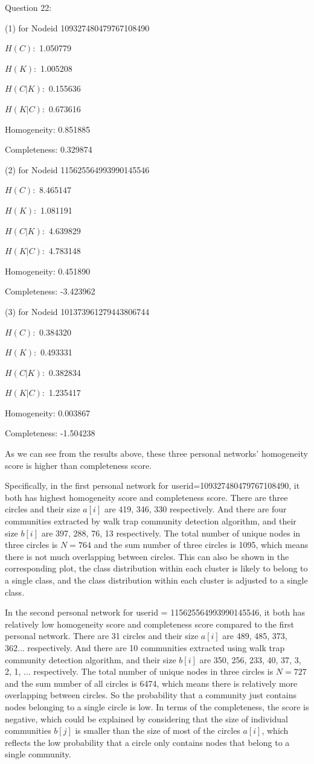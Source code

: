 \documentclass[11pt]{article}
\begin{document}
Question 22:

(1) for Nodeid 109327480479767108490 

$H(C):$ 1.050779

$H(K):$ 1.005208

$H(C | K):$ 0.155636

$H(K | C):$ 0.673616 

Homogeneity: 0.851885 

Completeness: 0.329874

(2) for Nodeid 115625564993990145546 

$H(C):$ 8.465147

$H(K):$ 1.081191

$H(C | K):$ 4.639829

$H(K | C):$ 4.783148 

Homogeneity: 0.451890 

Completeness: -3.423962

(3) for Nodeid 101373961279443806744 

$H(C):$ 0.384320

$H(K):$ 0.493331

$H(C | K):$ 0.382834

$H(K | C):$ 1.235417 

Homogeneity: 0.003867 

Completeness: -1.504238

As we can see from the results above, these three personal networks’ homogeneity score is higher than completeness score.

Specifically, in the first personal network for userid=109327480479767108490, it both has highest homogeneity score and completeness score. There are three circles and their size $a[i]$ are 419, 346, 330 respectively. And there are four communities extracted by walk trap community detection algorithm, and their size $b[i]$ are 397, 288, 76, 13 respectively. The total number of unique nodes in three circles is $N = 764$ and the sum number of three circles is 1095, which means there is not much overlapping between circles. This can also be shown in the corresponding plot, the class distribution within each cluster is likely to belong to a single class, and the class distribution within each cluster is adjusted to a single class.

In the second personal network for userid = 115625564993990145546, it both has relatively low homogeneity score and completeness score compared to the first personal network. There are 31 circles and their size $a[i]$ are 489, 485, 373, 362... respectively. And there are 10 communities extracted using walk trap community detection algorithm, and their size $b[i]$ are 350, 256, 233, 40, 37, 3, 2, 1, ... respectively. The total number of unique nodes in three circles is $N = 727$ and the sum number of all circles is 6474, which means there is relatively more overlapping between circles. So the probability that a community just contains nodes belonging to a single circle is low. In terms of the completeness, the score is negative, which could be explained by considering that the size of individual communities $b[j]$ is smaller than the size of most of the circles $a[i]$, which reflects the low probability that a circle only contains nodes that belong to a single community.
\end{document}
